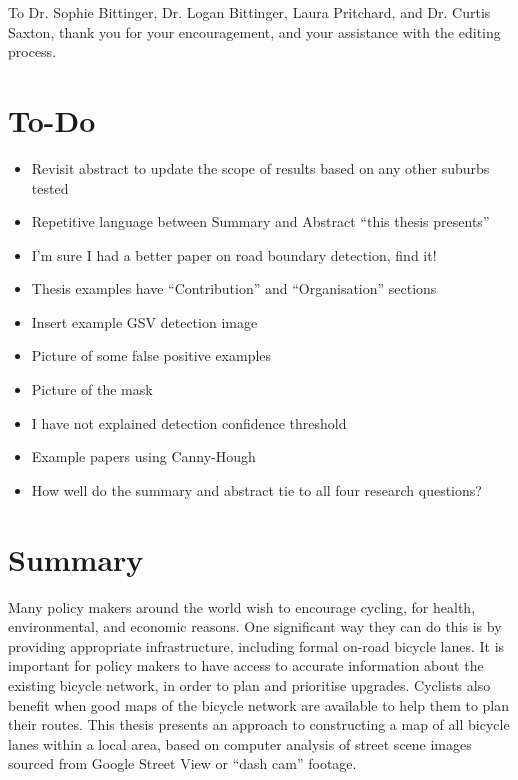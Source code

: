 \documentclass[11pt,twoside]{report}
\begin{document}
To Dr. Sophie Bittinger, Dr. Logan Bittinger, Laura Pritchard, and Dr. Curtis Saxton, thank you for your encouragement, and your assistance with the editing process.



\chapter*{To-Do}

\begin{itemize}
\item{Revisit abstract to update the scope of results based on any other suburbs tested}
\item{Repetitive language between Summary and Abstract ``this thesis presents''}
\item{I'm sure I had a better paper on road boundary detection, find it!}
\item{Thesis examples have ``Contribution'' and ``Organisation'' sections}
\item{Insert example GSV detection image}
\item{Picture of some false positive examples}
\item{Picture of the mask}
\item{I have not explained detection confidence threshold}
\item{Example papers using Canny-Hough}
\item{How well do the summary and abstract tie to all four research questions?}
\end{itemize}

\chapter*{Summary}

Many policy makers around the world wish to encourage cycling, for health, environmental, and economic reasons.  One significant way they can do this is by providing appropriate infrastructure, including formal on-road bicycle lanes.  It is important for policy makers to have access to accurate information about the existing bicycle network, in order to plan and prioritise upgrades.  Cyclists also benefit when good maps of the bicycle network are available to help them to plan their routes.  This thesis presents an approach to constructing a map of all bicycle lanes within a local area, based on computer analysis of street scene  images sourced from Google Street View or ``dash cam'' footage.
\end{document}
